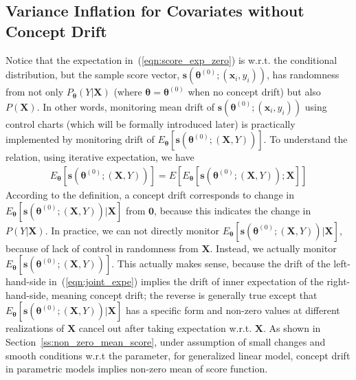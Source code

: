 \documentclass[twoside,11pt]{article}
\begin{document}
\subsection{Variance Inflation for Covariates without Concept Drift}
\label{ss:var_infla}
{Notice that the expectation in~(\ref{eqn:score_exp_zero}) is w.r.t. the conditional distribution, but the sample score vector, {$\bm{s} (\bm { \theta} ^{ (0)};(\bm {x}_i, y_i))$}, has randomness from not only $P_{\bm {\theta}} (Y|\bm {X})$ (where $\bm { \theta} = \bm { \theta}^{(0)}$ when no concept drift) but also $P (\bm {X})$. In other words, monitoring mean {drift} of {$\bm{s} (\bm { \theta}^{ (0)};(\bm {x}_i, y_i))$} using control charts (which will be formally introduced later) is practically implemented by monitoring drift of {$E _{ \bm { \theta}}[\bm{s} (\bm { \theta}^{ (0)};(\bm {X}, Y))]$}.
To understand the relation, using iterative expectation, we have}
\begin{align}
E_{ \bm { \theta} }[\bm{s} (\bm { \theta} ^{ (0)};(\bm {X}, Y))] = E [E _{ \bm { \theta} }[\bm{s} (\bm { \theta} ^{ (0)};(\bm {X}, Y)); \bm {X}]]
\label{eqn:joint_expe}
\end{align}
{According to the definition, a concept drift corresponds to change in $E _{ \bm { \theta} }[\bm{s} (\bm { \theta} ^{ (0)};(\bm {X}, Y))| \bm {X}]$ from $\bm{0}$, because this indicates the change in $P(Y|\bm {X})$. In practice, we can not directly monitor $E _{ \bm { \theta} }[\bm{s} (\bm { \theta} ^{ (0)};(\bm {X}, Y))| \bm {X}]$, because of lack of control in randomness from $\bm {X}$. Instead, we actually monitor $E_{ \bm { \theta} }[\bm{s} (\bm { \theta} ^{ (0)};(\bm {X}, Y))]$. This actually makes sense, because the {drift} of the left-hand-side in~(\ref{eqn:joint_expe}) implies the {drift} of inner expectation of the right-hand-side, meaning concept drift; the reverse is generally true except that {$E _{ \bm { \theta} }[\bm{s} (\bm { \theta} ^{ (0)};(\bm {X}, Y))| \bm {X}]$} has a specific form and non-zero values at different realizations of $\bm {X}$ cancel out after taking expectation w.r.t. $\bm {X}$. As shown in Section~\ref{ss:non_zero_mean_score}, under assumption of small changes and smooth conditions w.r.t the parameter, for generalized linear model, concept drift in parametric models implies non-zero mean of score function.}
\end{document}
